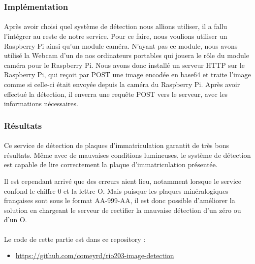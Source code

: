 \subsubsection*{Implémentation}
\paragraph*{}
Après avoir choisi quel système de détection nous allions utiliser, il a fallu l'intégrer au reste de notre service.
Pour ce faire, nous voulions utiliser un Raspberry Pi ainsi qu'un module caméra. N'ayant pas ce module, nous avons utilisé la Webcam d'un de nos ordinateurs portables qui jouera le rôle du module caméra pour le Raspberry Pi.
Nous avons donc installé un serveur HTTP sur le Raspberry Pi, qui reçoit par POST une image encodée en base64 et traite l'image comme si celle-ci était envoyée depuis la caméra du Raspberry Pi. Après avoir effectué la détection, il enverra une requête POST vers le serveur, avec les informations nécessaires.



\subsubsection*{Résultats}

\paragraph*{}
Ce service de détection de plaques d'immatriculation garantit de très bons résultats. Même avec de mauvaises conditions lumineuses, le système de détection est capable de lire correctement la plaque d'immatriculation présentée.

Il est cependant arrivé que des erreurs aient lieu, notamment lorsque le service confond le chiffre 0 et la lettre O.
Mais puisque les plaques minéralogiques françaises sont sous le format AA-999-AA, il est donc possible d'améliorer la solution en chargeant le serveur de rectifier la mauvaise détection d'un zéro ou d'un O.


\paragraph*{}
Le code de cette partie est dans ce repository :
\begin{itemize}
    \item \url{https://github.com/comeyrd/rio203-image-detection}
\end{itemize}